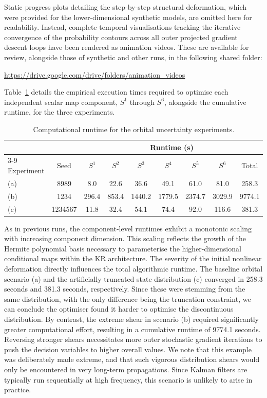 Static progress plots detailing the step-by-step structural deformation, which were provided for the lower-dimensional synthetic models, are omitted here for readability. Instead, complete temporal visualisations tracking the iterative convergence of the probability contours across all outer projected gradient descent loops have been rendered as animation videos. These are available for review, alongside those of synthetic and other runs, in the following shared folder:
\begin{center}
    \href{https://drive.google.com/drive/folders/1FEkJWo6-cSvWa-dAoq2DXf_d0Pf9xZye?usp=sharing}{https://drive.google.com/drive/folders/animation\_videos}
\end{center}

Table~\ref{tab:gvm_runtimes} details the empirical execution times required to optimise each independent scalar map component, $S^1$ through $S^6$, alongside the cumulative runtime, for the three experiments.

\begin{table}[htbp]
    \centering
    \caption{Computational runtime for the orbital uncertainty experiments.}
    \label{tab:gvm_runtimes}
    \begin{tabular}{@{}lcccccccc@{}}
        & & \multicolumn{7}{c}{Runtime (s)} \\
        \cmidrule(l){3-9}
        Experiment & Seed & $S^1$ & $S^2$ & $S^3$ & $S^4$ & $S^5$ & $S^6$ & Total \\
        \midrule
        (a) & 8989 & 8.0 & 22.6 & 36.6 & 49.1 & 61.0 & 81.0 & 258.3 \\
        (b) & 1234 & 296.4 & 853.4 & 1440.2 & 1779.5 & 2374.7 & 3029.9 & 9774.1 \\
        (c) & 1234567 & 11.8 & 32.4 & 54.1 & 74.4 & 92.0 & 116.6 & 381.3 \\
        \bottomrule
    \end{tabular}
\end{table}

As in previous runs, the component-level runtimes exhibit a monotonic scaling with increasing component dimension. This scaling reflects the growth of the Hermite polynomial basis necessary to parameterise the higher-dimensional conditional maps within the KR architecture. The severity of the initial nonlinear deformation directly influences the total algorithmic runtime. The baseline orbital scenario (a) and the artificially truncated state distribution (c) converged in 258.3 seconds and 381.3 seconds, respectively. Since these were stemming from the same distribution, with the only difference being the truncation constraint, we can conclude the optimiser found it harder to optimise the discontinuous distribution. By contrast, the extreme shear in scenario (b) required significantly greater computational effort, resulting in a cumulative runtime of 9774.1 seconds. Reversing stronger shears necessitates more outer stochastic gradient iterations to push the decision variables to higher overall values. We note that this example was deliberately made extreme, and that such vigorous distribution shears would only be encountered in very long-term propagations. Since Kalman filters are typically run sequentially at high frequency, this scenario is unlikely to arise in practice.

